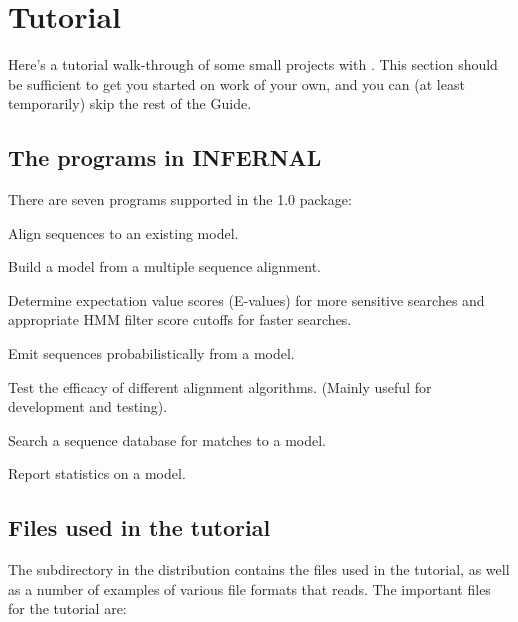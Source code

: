 \section{Tutorial}

Here's a tutorial walk-through of some small projects with
. This section should be sufficient to get 
you started on work of your own, and you can (at least temporarily)
skip the rest of the Guide.

\subsection {The programs in INFERNAL}

There are seven programs supported in the  1.0 package:

\begin{wideitem}
\item[\emprog{cmalign}] Align sequences to an existing model.
\item[\emprog{cmbuild}] Build a model from a multiple sequence alignment.
\item[\emprog{cmcalibrate}] Determine expectation value scores
  (E-values) for more sensitive searches and appropriate HMM filter
  score cutoffs for faster searches.
\item[\emprog{cmemit}] Emit sequences probabilistically from a model.
\item[\emprog{cmscore}] Test the efficacy of different alignment
  algorithms. (Mainly useful for development and testing).
\item[\emprog{cmsearch}] Search a sequence database for matches to a model.
\item[\emprog{cmstat}] Report statistics on a model.
\end{wideitem}

\subsection{Files used in the tutorial}

The subdirectory  in the  distribution contains the
files used in the tutorial, as well as a number of examples of various
file formats that  reads. The important files for the tutorial
are:

